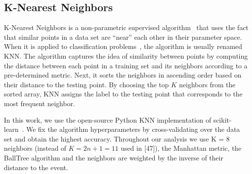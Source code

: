 \subsection*{K-Nearest Neighbors}

K-Nearest Neighbors is a non-parametric supervised algorithm~\cite{Fix:1951,Cover:1967} that uses the fact that similar points in a data set are ``near'' each other in their
parameter space. When it is applied to classification problems~\cite{Guo:2004}, the algorithm is usually renamed \ac{KNN}. The algorithm captures the idea of similarity between
points by computing the distance between each point in a training set and its neighbors according to a pre-determined metric. Next, it sorts the neighbors in ascending order based on
their distance to the testing point. By choosing the top $K$ neighbors from the sorted array, \ac{KNN} assigns the label to the testing point that corresponds to the most
frequent neighbor.

In this work, we use the open-source Python \ac{KNN} implementation of scikit-learn~\cite{Pedregosa:2011ork}. We fix the algorithm hyperparameters by cross-validating over the data set and obtain the highest accuracy. Throughout our analysis we use K = 8 neighbors (instead of $K = 2n + 1 = 11$ used in [47]), the Manhattan metric, the BallTree algorithm and the neighbors are weighted by the inverse of their distance to the event.

\begin{comment}
\mmt{Marina: I would remove this part and just say the options that we fix. I don't think we need to describe the options in the library.
In this implementation, the distance between the different neighbors can be
computed using different metrics: Euclidean, Manhattan, Chebyshev, and Mahalanobis~\cite{ADictionaryofStatistics}. The prediction can be weighted by the inverse of the distance or equally
weighted in the neighborhood of each data point. The nearest neighbors can be estimated with different methods: BallTree, KDTree, or a brute-force search~\cite{Bentley1975,Omohundro1989}. All these parameters are tunable to optimize the algorithm for the problem at hand. Following Ref.~\cite{Chatterjee:2019avs}, we fix the optimal number of neighbors to $K \approx 2n+1$,
where $n$ is the number of features of each data point. According to usual practice, we cross-validate the prediction by computing the accuracy, defined as the fraction of correctly classified events, over a range of possible values for the parameters of the algorithm.}
\end{comment}



